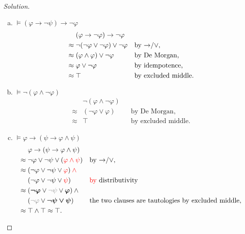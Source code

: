 \documentclass[letter]{article}
\theoremstyle{definition}
\newenvironment{solution}
{\begin{proof}[Solution]}
	{\end{proof}}
\renewcommand{\phi}{\varphi}
\begin{document}
\begin{solution}
\begin{enumerate}[(a)]
  \item $\models (\phi \to \neg \psi) \to \neg \phi$
\begin{align*}
  & (\phi \to \neg \phi) \to \neg \phi &&
\\ \approx{}
  & \neg (\neg \phi \vee \neg \phi) \vee \neg \phi
  && \text{by \tolor,}
\\ \approx{}
  & (\phi \wedge \phi) \vee \neg \phi
  && \text{by De Morgan,}
\\ \approx{}
  & \phi \lor \neg \phi
  && \text{by idempotence,}
\\ \approx{}
  & \top
  && \text{by excluded middle.}
\end{align*}

  \item $\models \neg (\phi \land \neg \phi)$
\begin{align*}
  & \neg (\phi \land \neg \phi) &&
\\ \approx{}
  & (\neg \phi \lor \phi)
  && \text{by De Morgan,}
\\ \approx{}
  & \top
  && \text{by excluded middle.}
\end{align*}

  \item $\models \phi \to (\psi \to \phi \land \psi)$
\begin{align*}
  & \phi \to (\psi \to \phi \land \psi) &&
\\ \approx{}
  & \neg \phi \lor \neg \psi \lor ({\color{red} \phi \land \psi})
  && \text{by \tolor,}
\\ \approx{}
    & (\neg \phi \lor \neg \psi \lor {\color{red}\phi}) \colop{red}{\land} {}
    &&
\\  & (\neg \phi \lor \neg \psi \lor {\color{red}\psi})
    && \text{\textcolor{red}{by} distributivity}
\\ \approx{}
    & (\bm{\neg \phi} \lor {\color{gray}\neg \psi} \lor \bm{\phi}) \land {}
    &&
\\  & ({\color{gray}\neg \phi} \lor \bm{\neg \psi \lor \psi})
    && \text{the two clauses are tautologies by excluded middle,}
\\ \approx{}
    & \top \wedge \top \approx \top.
    &&
\end{align*}


\end{enumerate}
\end{solution}
\end{document}

